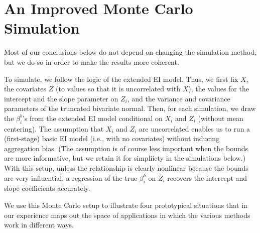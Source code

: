 \documentclass[11pt,titlepage]{article}
\begin{document}
\section{An Improved Monte Carlo Simulation} \label{s:alt}

Most of our conclusions below do not depend on changing the simulation
method, but we do so in order to make the results more coherent.

To simulate, we follow the logic of the extended EI model.  Thus, we
first fix $X$, the covariates $Z$ (to values so that it is
uncorrelated with $X$), the values for the intercept and the slope
parameter on $Z_i$, and the variance and covariance parameters of the
truncated bivariate normal.  Then, for each simulation, we draw the
$\beta_i^b$'s from the extended EI model conditional on $X_i$ and
$Z_i$ (without mean centering).  The assumption that $X_i$ and $Z_i$
are uncorrelated enables us to run a (first-stage) basic EI model
(i.e., with no covariates) without inducing aggregation bias.  (The
assumption is of course less important when the bounds are more
informative, but we retain it for simpliicty in the simulations
below.)  With this setup, unless the relationship is clearly nonlinear
because the bounds are very influential, a regression of the true
$\beta_i^b$ on $Z_i$ recovers the intercept and slope coefficients
accurately.

We use this Monte Carlo setup to illustrate four prototypical
situations that in our experience maps out the space of applications
in which the various methods work in different ways.
\end{document}
